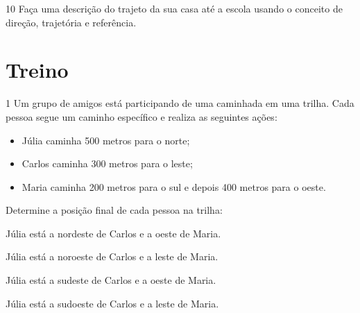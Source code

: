 
\num{10} Faça uma descrição do trajeto da sua casa até a escola usando o
conceito de direção, trajetória e referência.


\section{Treino}

\num{1} Um grupo de amigos está participando de uma caminhada em uma trilha.
Cada pessoa segue um caminho específico e realiza as seguintes ações:

\begin{itemize}
\item Júlia caminha 500 metros para o norte; 
\item Carlos caminha 300 metros para o leste; 
\item Maria caminha 200 metros para o sul e depois 400 metros para o oeste.
\end{itemize}

Determine a posição final de cada pessoa na trilha:

\begin{escolha}
\item
  Júlia está a nordeste de Carlos e a oeste de Maria.
\item
  Júlia está a noroeste de Carlos e a leste de Maria.
\item
  Júlia está a sudeste de Carlos e a oeste de Maria.
\item
  Júlia está a sudoeste de Carlos e a leste de Maria.
\end{escolha}


